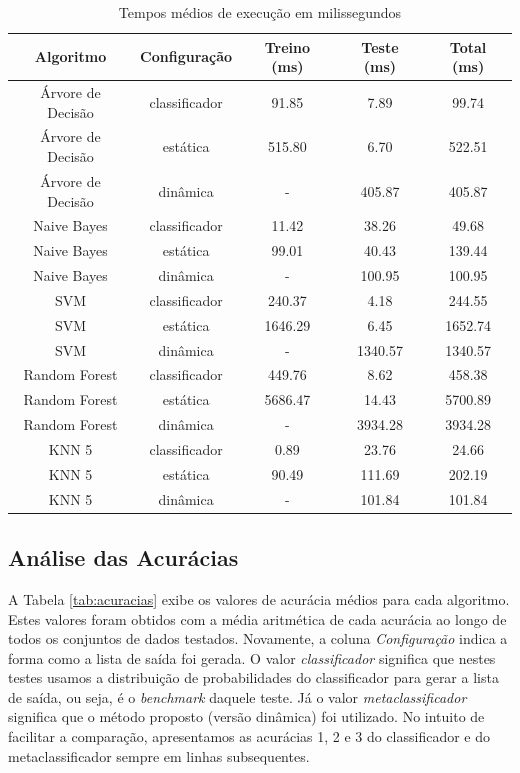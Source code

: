 {\begin{table}[h!]
  \begin{center}
    \resizebox{\textwidth}{!} {
    \begin{tabular}{ccccc}
      \hline
      \textbf{Algoritmo} & \textbf{Configuração} & \textbf{Treino (ms)} & \textbf{Teste (ms)} & \textbf{Total (ms)}\\
      \hline

      Árvore de Decisão & classificador & 91.85 & 7.89 & 99.74\\
      Árvore de Decisão & estática & 515.80 & 6.70 & 522.51\\
      Árvore de Decisão & dinâmica & - & 405.87 & 405.87\\
      Naive Bayes &  classificador & 11.42 & 38.26 & 49.68\\
      Naive Bayes &  estática & 99.01 & 40.43 & 139.44\\
      Naive Bayes &  dinâmica & - & 100.95 & 100.95\\
      SVM & classificador & 240.37 & 4.18 & 244.55\\
      SVM & estática & 1646.29 & 6.45 & 1652.74\\
      SVM & dinâmica & - & 1340.57 & 1340.57\\
      Random Forest &  classificador & 449.76 & 8.62 & 458.38\\
      Random Forest &  estática & 5686.47 & 14.43 & 5700.89\\
      Random Forest &  dinâmica & - & 3934.28 & 3934.28\\
      KNN 5 & classificador & 0.89 & 23.76 & 24.66\\
      KNN 5 & estática  & 90.49 & 111.69  & 202.19\\
      KNN 5 & dinâmica  & - & 101.84 & 101.84\\

      \hline
    \end{tabular}
    }
    \caption{Tempos médios de execução em milissegundos}
    \label{tab:tempostestes}
  \end{center}
\end{table}

\subsection{Análise das Acurácias}

A Tabela \ref{tab:acuracias} exibe os valores de acurácia médios para cada algoritmo. 
Estes valores foram obtidos com a média aritmética de cada acurácia ao longo de todos os conjuntos de dados testados.
Novamente, a coluna \textit{Configuração} indica a forma como a lista de saída foi gerada. 
O valor \textit{classificador} significa que nestes testes usamos a distribuição de probabilidades do classificador para gerar a lista de saída, ou seja, é o \textit{benchmark} daquele teste.
Já o valor \textit{metaclassificador} significa que o método proposto (versão dinâmica) foi utilizado.
No intuito de facilitar a comparação, apresentamos as acurácias 1, 2 e 3 do classificador e do metaclassificador sempre em linhas subsequentes.

}
